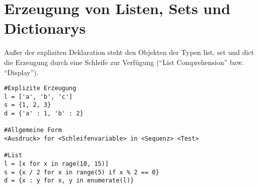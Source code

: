 \section{Erzeugung von Listen, Sets und Dictionarys}
Außer der expliziten Deklaration steht den Objekten der Typen list, set  und dict die Erzeugung durch eine Schleife zur Verfügung (``List Comprehension'' bzw. ``Display'').
\begin{lstlisting}
#Explizite Erzeugung
l = ['a', 'b', 'c']
s = {1, 2, 3}
d = {'a' : 1, 'b' : 2}

#Allgemeine Form
<Ausdruck> for <Schleifenvariable> in <Sequenz> <Test>

#List
l = [x for x in rage(10, 15)]
s = {x / 2 for x in range(5) if x % 2 == 0}
d = {x : y for x, y in enumerate(l)}
\end{lstlisting}

